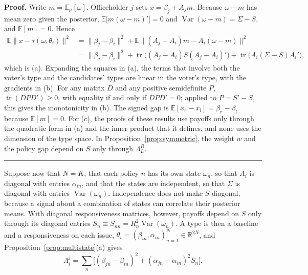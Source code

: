 \documentclass[12pt,letterpaper]{article}
\newenvironment{proof}[1][Proof]{\noindent\textbf{#1.} }{\ \rule{0.5em}{0.5em}}
\begin{document}
\begin{proof}
Write $m=\mathbb{E}_\mu[\omega]$. Officeholder $j$ sets $x=\beta_j+A_jm$. Because $\omega-m$ has mean zero given the posterior, $\mathbb{E}\big[m(\omega-m)'\big]=0$ and $\operatorname{Var}(\omega-m)=\Sigma-S$, and $\mathbb{E}[m]=0$. Hence
\[
\begin{aligned}
\mathbb{E}\|x-\tau(\omega,\theta_i)\|^2
&=\|\beta_j-\beta_i\|^2+\mathbb{E}\big\|(A_j-A_i)m-A_i(\omega-m)\big\|^2\\
&=\|\beta_j-\beta_i\|^2+\operatorname{tr}\big((A_j-A_i)S(A_j-A_i)'\big)+\operatorname{tr}\big(A_i(\Sigma-S)A_i'\big),
\end{aligned}
\]
which is (a). Expanding the squares in (a), the terms that involve both the voter's type and the candidates' types are linear in the voter's type, with the gradients in (b). For any matrix $D$ and any positive semidefinite $P$, $\operatorname{tr}(DPD')\ge0$, with equality if and only if $DPD'=0$; applied to $P=S'-S$, this gives the monotonicity in (b). The signed gap is $\mathbb{E}[x_r-x_l]=\beta_r-\beta_l$ because $\mathbb{E}[m]=0$. For (c), the proofs of these results use payoffs only through the quadratic form in (a) and the inner product that it defines, and none uses the dimension of the type space. In Proposition~\ref{prop:symmetric}, the weight $w$ and the policy gap depend on $S$ only through $\Lambda_L^R$.
\end{proof}

Suppose now that $N=K$, that each policy $n$ has its own state $\omega_n$, so that $A_i$ is diagonal with entries $\alpha_{in}$, and that the states are independent, so that $\Sigma$ is diagonal with entries $\operatorname{Var}(\omega_n)$. Independence does not make $S$ diagonal, because a signal about a combination of states can correlate their posterior means. With diagonal responsiveness matrices, however, payoffs depend on $S$ only through its diagonal entries $S_n\equiv S_{nn}=R_n^2\operatorname{Var}(\omega_n)$. A type is then a baseline and a responsiveness on each issue, $\theta_i=(\beta_{in},\alpha_{in})_{n=1}^N\in\mathbb{R}^{2N}$, and Proposition~\ref{prop:multistate}(a) gives
\[
\Lambda_i^j=\sum_n\Big[(\beta_{jn}-\beta_{in})^2+(\alpha_{jn}-\alpha_{in})^2S_n\Big].
\]
\end{document}
